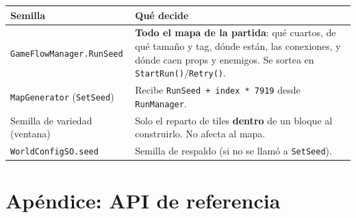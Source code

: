 \documentclass[11pt,a4paper]{article}
\newcommand{\code}[1]{\texttt{#1}}
\begin{document}
\begin{center}
\begin{tabular}{@{}p{4.6cm}p{11.4cm}@{}}
\toprule
\textbf{Semilla} & \textbf{Qué decide} \\
\midrule
\code{GameFlowManager.RunSeed} & \textbf{Todo el mapa de la partida}: qué cuartos, de qué tamaño y tag, dónde están, las conexiones, y dónde caen props y enemigos. Se sortea en \code{StartRun()}/\code{Retry()}. \\
\code{MapGenerator} (\code{SetSeed}) & Recibe \code{RunSeed + index * 7919} desde \code{RunManager}. \\
Semilla de variedad (ventana) & Solo el reparto de tiles \textbf{dentro} de un bloque al construirlo. No afecta al mapa. \\
\code{WorldConfigSO.seed} & Semilla de respaldo (si no se llamó a \code{SetSeed}). \\
\bottomrule
\end{tabular}
\end{center}

\section{Apéndice: API de referencia}
\end{document}
